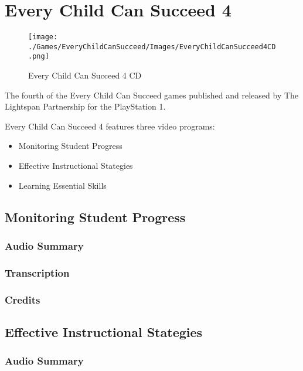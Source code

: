 \chapter{Every Child Can Succeed 4}

\begin{figure}[H]
    \centering
    \texttt{[image: ./Games/EveryChildCanSucceed/Images/EveryChildCanSucceed4CD.png]}
    \caption{Every Child Can Succeed 4 CD}
\end{figure}


The fourth of the Every Child Can Succeed games published and released by The Lightspan Partnership for the PlayStation 1.

Every Child Can Succeed 4 features three video programs:

\begin{itemize}
    \item Monitoring Student Progress
    \item Effective Instructional Stategies
    \item Learning Essential Skills
\end{itemize}

\clearpage
\newpage

\section{Monitoring Student Progress}

\subsection{Audio Summary}

\subsection{Transcription}

\subsection{Credits}

\section{Effective Instructional Stategies}

\subsection{Audio Summary}

